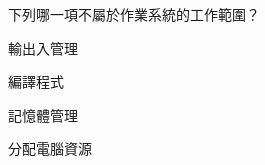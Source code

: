 \ifx\ntpcNinetyThree\undefined[93學年基北區] \fi
下列哪一項不屬於作業系統的工作範圍？
  \begin{optionlist}
  \item 輸出入管理
  \item 編譯程式\label{ntpc-93-a29}
  \item 記憶體管理
  \item 分配電腦資源
  \end{optionlist}
